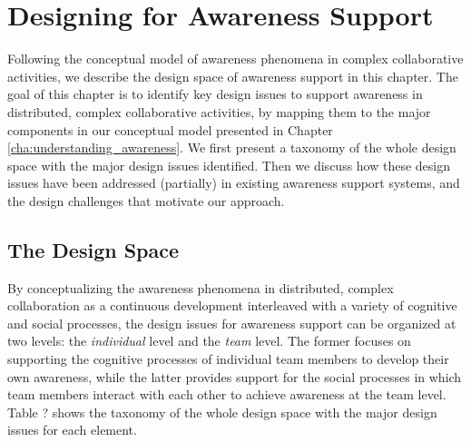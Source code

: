 \graphicspath{{Figures/}}

\chapter{Designing for Awareness Support} %
\label{cha:designing_for_awareness_support}
Following the conceptual model of awareness phenomena in complex collaborative activities, we describe the design space of awareness support in this chapter. The goal of this chapter is to identify key design issues to support awareness in distributed, complex collaborative activities, by mapping them to the major components in our conceptual model presented in Chapter \ref{cha:understanding_awareness}. We first present a taxonomy of the whole design space with the major design issues identified. Then we discuss how these design issues have been addressed (partially) in existing awareness support systems, and the design challenges that motivate our approach. 

\section{The Design Space} %
\label{sec:the_design_space}
By conceptualizing the awareness phenomena in distributed, complex collaboration as a continuous development interleaved with a variety of cognitive and social processes, the design issues for awareness support can be organized at two levels: the \emph{individual} level and the \emph{team} level. The former focuses on supporting the cognitive processes of individual team members to develop their own awareness, while the latter provides support for the social processes in which team members interact with each other to achieve awareness at the team level. Table ? shows the taxonomy of the whole design space with the major design issues for each element.

